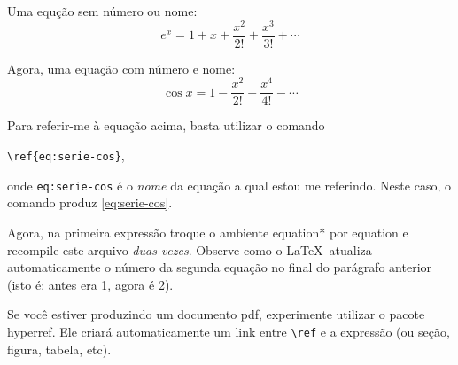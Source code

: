 \documentclass[a4paper,12pt]{article}
\newcommand{\pacote}[1]{{\normalfont\ttfamily#1}}
\newcommand{\ambiente}[1]{{\normalfont\sffamily#1}}
\begin{document}
		
	Uma equção sem número ou nome:	
	\begin{equation*} %
	e^x = 1 + x + \frac{x^2}{2!} + \frac{x^3}{3!} + \cdots
	\end{equation*}
	
	Agora, uma equação com número e nome:
	\begin{equation}\label{eq:serie-cos}
	\cos x = 1 - \frac{x^2}{2!} + \frac{x^4}{4!} - \cdots
	\end{equation}
	
	Para referir-me à equação acima, basta utilizar o comando	
	\begin{center}	
	\verb|\ref{eq:serie-cos}|,
	\end{center}	
	onde \texttt{eq:serie-cos} é o \emph{nome} da equação a qual estou me referindo.
	Neste caso, o comando produz \textcolor{red}{\ref{eq:serie-cos}}.
	
	Agora, na primeira expressão troque o ambiente \ambiente{equation*} por
	\ambiente{equation} e recompile este arquivo \emph{duas vezes}. Observe
	como o \LaTeX\ atualiza automaticamente o número da segunda equação no
	final do parágrafo anterior (isto é: antes era 1, agora é 2).
	
	Se você estiver produzindo um documento pdf, experimente utilizar o pacote
	\pacote{hyperref}. Ele criará automaticamente um link entre \verb|\ref| e a
	expressão (ou seção, figura, tabela, etc).
	
\end{document}
